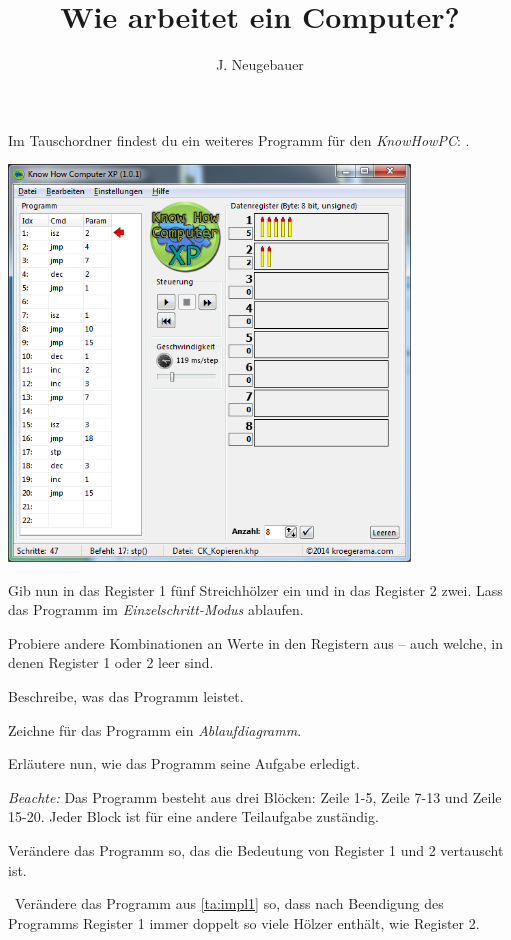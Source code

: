 \documentclass[10pt, a4paper]{scrartcl}
\author{J. Neugebauer}
\title{Wie arbeitet ein Computer?}
\date{\Heute}
\begin{document}
\ReiheTitel

\begin{aufgabe}[symbol=\symLaptop]
	Im Tauschordner findest du ein weiteres Programm für den \emph{KnowHowPC}: .
	
	\begin{center}
		\includegraphics[width=0.8\textwidth]{9Diff-AB.III.3-Abb-1}
	\end{center}
	
	\begin{teilaufgaben}
		\teilaufgabe Gib nun in das Register 1 fünf Streichhölzer ein und in das Register 2 zwei. Lass das Programm im \emph{Einzelschritt-Modus} ablaufen.
		
		\teilaufgabe Probiere andere Kombinationen an Werte in den Registern aus – auch welche, in denen Register 1 oder 2 leer sind.
		
		\teilaufgabe Beschreibe, was das Programm leistet.
		
		\teilaufgabe Zeichne für das Programm ein \emph{Ablaufdiagramm}.
		
		\teilaufgabe Erläutere nun, wie das Programm seine Aufgabe erledigt.
		
		\emph{Beachte:} Das Programm besteht aus drei Blöcken: Zeile 1-5, Zeile 7-13 und Zeile 15-20. Jeder Block ist für eine andere Teilaufgabe zuständig.
		
		\teilaufgabe\label{ta:impl1} Verändere das Programm so, das die Bedeutung von Register 1 und 2 vertauscht ist.
		
		\teilaufgabe\symStern\ Verändere das Programm aus \ref{ta:impl1} so, dass nach Beendigung des Programms Register 1 immer doppelt so viele Hölzer enthält, wie Register 2.
	\end{teilaufgaben}
\end{aufgabe}
\end{document}
